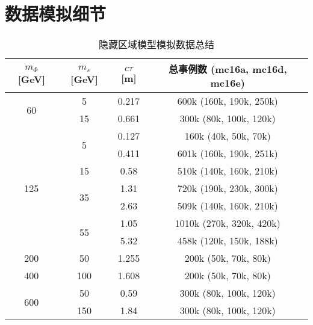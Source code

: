 
\chapter{数据模拟细节}
\label{cpm:MC}

\begin{table}[ht]
      \centering
      \caption{隐藏区域模型模拟数据总结}
      \label{tab:signal_MC}
      \begin{tabular}{cccc}
            \toprule
            $m_\Phi$ [GeV] & $m_s$ [GeV]          & $c\tau$ [m] & 总事例数 (mc16a, mc16d, mc16e) \\
            \midrule
            \multirow{2}{*}{60}
                           & 5                    & 0.217       & 600k (160k, 190k, 250k)        \\
                           & 15                   & 0.661       & 300k (80k, 100k, 120k)         \\
            \midrule
            \multirow{7}{*}{125}
                           & \multirow{2}{*}{5}   & 0.127       & 160k (40k, 50k, 70k)           \\
                           &                      & 0.411       & 601k (160k, 190k, 251k)        \\
                           & 15                   & 0.58        & 510k (140k, 160k, 210k)        \\
                           & \multirow{2}{*}{35}  & 1.31        & 720k (190k, 230k, 300k)        \\
                           &                      & 2.63        & 509k (140k, 160k, 210k)        \\
                           & \multirow{2}{*}{55}  & 1.05        & 1010k (270k, 320k, 420k)       \\
                           &                      & 5.32        & 458k (120k, 150k, 188k)        \\
            \midrule
            200            & 50                   & 1.255       & 200k (50k, 70k, 80k)           \\
            \midrule
            400            & 100                  & 1.608       & 200k (50k, 70k, 80k)           \\
            \midrule
            \multirow{4}{*}{600}
                           & 50                   & 0.59        & 300k (80k, 100k, 120k)         \\
                           & \multirow{2}{*}{150} & 1.84        & 300k (80k, 100k, 120k)         \\

\end{tabular}
\end{table}

